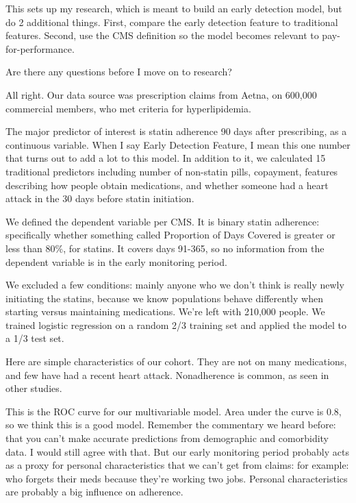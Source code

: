 \documentclass[12pt]{report}
\begin{document}
\begin{large}
This sets up my research, which is meant to build an early detection
model, but do 2 additional things. First, compare the early detection
feature to traditional features. Second, use the CMS definition so the
model becomes relevant to pay-for-performance.

Are there any questions before I move on to research?







All right. Our data source was prescription claims from Aetna, on
600,000 commercial members, who met criteria for hyperlipidemia.

The major predictor of interest is statin adherence 90 days after
prescribing, as a continuous variable. When I say Early Detection
Feature, I mean this one number that turns out to add a lot to this
model. In addition to it, we calculated 15 traditional predictors
including number of non-statin pills, copayment, features describing
how people obtain medications, and whether someone had a heart attack
in the 30 days before statin initiation.

We defined the dependent variable per CMS. It is binary statin
adherence: specifically whether something called Proportion of Days
Covered is greater or less than 80\%, for statins. It covers days
91-365, so no information from the dependent variable is in the early
monitoring period.

We excluded a few conditions: mainly anyone who we don't think is
really newly initiating the statins, because we know populations
behave differently when starting versus maintaining medications. We're
left with 210,000 people. We trained logistic regression on a random
2/3 training set and applied the model to a 1/3 test set.

Here are simple characteristics of our cohort. They are not on many
medications, and few have had a recent heart attack. Nonadherence is
common, as seen in other studies.

This is the ROC curve for our multivariable model. Area under the
curve is 0.8, so we think this is a good model. Remember the
commentary we heard before: that you can't make accurate predictions
from demographic and comorbidity data. I would still agree with that.
But our early monitoring period probably acts as a proxy for personal
characteristics that we can't get from claims: for example: who
forgets their meds because they're working two jobs. Personal
characteristics are probably a big influence on adherence.


\end{large}
\end{document}
